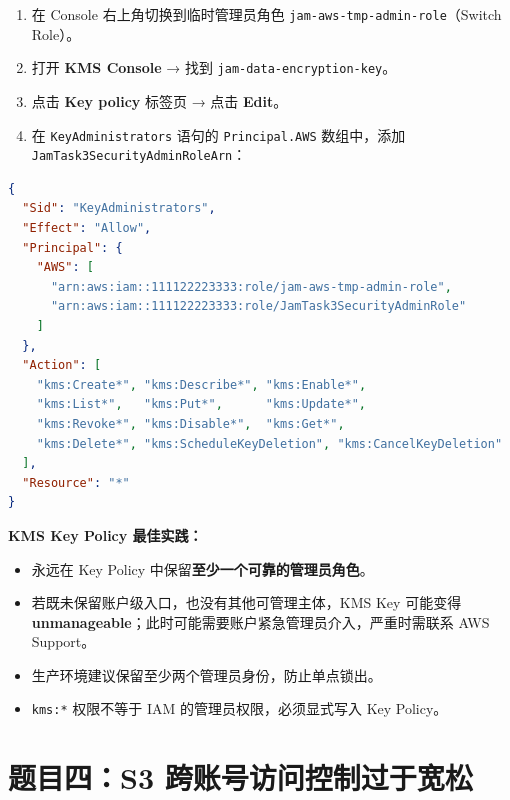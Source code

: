 \documentclass[12pt, a4paper]{article}
\begin{document}
\begin{solution}
\begin{enumerate}
    \item 在 Console 右上角切换到临时管理员角色 \texttt{jam-aws-tmp-admin-role}（Switch Role）。
    \item 打开 \textbf{KMS Console} → 找到 \texttt{jam-data-encryption-key}。
    \item 点击 \textbf{Key policy} 标签页 → 点击 \textbf{Edit}。
    \item 在 \texttt{KeyAdministrators} 语句的 \texttt{Principal.AWS} 数组中，添加 \texttt{JamTask3SecurityAdminRoleArn}：
\end{enumerate}
\end{solution}

\begin{lstlisting}[language=json, caption=修复后的 Key Policy]
{
  "Sid": "KeyAdministrators",
  "Effect": "Allow",
  "Principal": {
    "AWS": [
      "arn:aws:iam::111122223333:role/jam-aws-tmp-admin-role",
      "arn:aws:iam::111122223333:role/JamTask3SecurityAdminRole"
    ]
  },
  "Action": [
    "kms:Create*", "kms:Describe*", "kms:Enable*",
    "kms:List*",   "kms:Put*",      "kms:Update*",
    "kms:Revoke*", "kms:Disable*",  "kms:Get*",
    "kms:Delete*", "kms:ScheduleKeyDeletion", "kms:CancelKeyDeletion"
  ],
  "Resource": "*"
}
\end{lstlisting}

\begin{keypoint}
\textbf{KMS Key Policy 最佳实践：}
\begin{itemize}
    \item 永远在 Key Policy 中保留\textbf{至少一个可靠的管理员角色}。
    \item 若既未保留账户级入口，也没有其他可管理主体，KMS Key 可能变得 \textbf{unmanageable}；此时可能需要账户紧急管理员介入，严重时需联系 AWS Support。
    \item 生产环境建议保留至少两个管理员身份，防止单点锁出。
    \item \texttt{kms:*} 权限不等于 IAM 的管理员权限，必须显式写入 Key Policy。
\end{itemize}
\end{keypoint}

\newpage
\section{题目四：S3 跨账号访问控制过于宽松}
\end{document}
